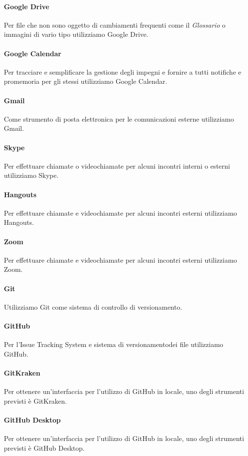 			\paragraph{Google Drive}
				Per file che non sono oggetto di cambiamenti frequenti come il \textit{Glossario} o immagini di vario tipo utilizziamo Google Drive.
			\paragraph{Google Calendar}
				Per tracciare e semplificare la gestione degli impegni e fornire a tutti notifiche e promemoria per gli stessi utilizziamo Google Calendar.
			\paragraph{Gmail}
				Come strumento di posta elettronica per le comunicazioni esterne utilizziamo Gmail.
			\paragraph{Skype}
				Per effettuare chiamate o videochiamate per alcuni incontri interni o esterni utilizziamo Skype.
			\paragraph{Hangouts}
				Per effettuare chiamate e videochiamate per alcuni incontri esterni utilizziamo Hangouts.
			\paragraph{Zoom}
				Per effettuare chiamate e videochiamate per alcuni incontri esterni utilizziamo Zoom.
			\paragraph{Git}
				Utilizziamo Git come sistema di controllo di versionamento\glo.
			\paragraph{GitHub}
				Per l'Issue Tracking System e sistema di versionamento\glosp dei file utilizziamo GitHub.
			\paragraph{GitKraken}
				Per ottenere un'interfaccia per l'utilizzo di GitHub in locale, uno degli strumenti previsti è GitKraken.
			\paragraph{GitHub Desktop}
				Per ottenere un'interfaccia per l'utilizzo di GitHub in locale, uno degli strumenti previsti è GitHub Desktop.
